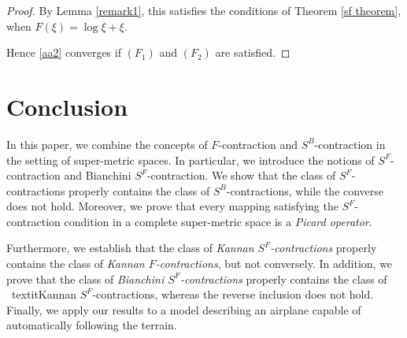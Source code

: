 \documentclass[pdflatex,sn-mathphys-num]{sn-jnl}%
\theoremstyle{thmstyleone}%
\theoremstyle{thmstyletwo}%
\theoremstyle{thmstylethree}%
\begin{document}
\begin{proof}
By Lemma \ref{remark1}, this satisfies the conditions of Theorem \ref{sf theorem}, when $F(\xi) = \log \xi+\xi$.


Hence \eqref{aa2} converges if $(F_1)$ and $(F_2)$ are satisfied.
\end{proof}







 

\section{Conclusion}\label{sec13}

In this paper, we combine the concepts of \(F\)-contraction and \(S^{B}\)-contraction in the setting of super-metric spaces. In particular, we introduce the notions of \(S^{F}\)-contraction and Bianchini \(S^{F}\)-contraction. We show that the class of \(S^{F}\)-contractions properly contains the class of \(S^{B}\)-contractions, while the converse does not hold. Moreover, we prove that every mapping satisfying the \(S^{F}\)-contraction condition in a complete super-metric space is a \textit{Picard operator}.

Furthermore, we establish that the class of \textit{Kannan \(S^{F}\)-contractions} properly contains the class of \textit{Kannan \(F\)-contractions}, but not conversely. In addition, we prove that the class of \textit{Bianchini \(S^{F}\)-contractions} properly contains the class of \ textit{Kannan \(S^{F}\)-contractions}, whereas the reverse inclusion does not hold. Finally, we apply our results to a model describing an airplane capable of automatically following the terrain.

\backmatter
\end{document}
